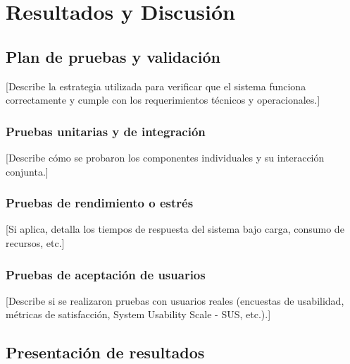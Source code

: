 
\chapter{Resultados y Discusión}


\section{Plan de pruebas y validación}

[Describe la estrategia utilizada para verificar que el sistema funciona correctamente y cumple con los requerimientos técnicos y operacionales.]

\subsection{Pruebas unitarias y de integración}
[Describe cómo se probaron los componentes individuales y su interacción conjunta.]

\subsection{Pruebas de rendimiento o estrés}
[Si aplica, detalla los tiempos de respuesta del sistema bajo carga, consumo de recursos, etc.]

\subsection{Pruebas de aceptación de usuarios}
[Describe si se realizaron pruebas con usuarios reales (encuestas de usabilidad, métricas de satisfacción, System Usability Scale - SUS, etc.).]

\section{Presentación de resultados}

